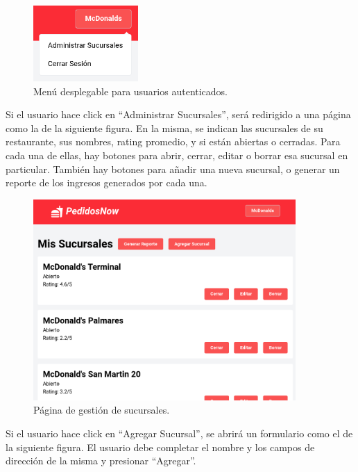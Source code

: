 \begin{figure}[H]
    \centering
    \includegraphics[width=4cm]{./img/dropdown.png}
    \caption{Menú desplegable para usuarios autenticados.}
\end{figure}

Si el usuario hace click en ``Administrar Sucursales'', será redirigido a una página como la de la siguiente figura. En la misma, se indican las sucursales de su restaurante, sus nombres, rating promedio, y si están abiertas o cerradas. Para cada una de ellas, hay botones para abrir, cerrar, editar o borrar esa sucursal en particular. También hay botones para añadir una nueva sucursal, o generar un reporte de los ingresos generados por cada una.

\begin{figure}[H]
    \centering
    \includegraphics[width=10cm]{./img/locations.png}
    \caption{Página de gestión de sucursales.}
\end{figure}

Si el usuario hace click en ``Agregar Sucursal'', se abrirá un formulario como el de la siguiente figura. El usuario debe completar el nombre y los campos de dirección de la misma y presionar ``Agregar''.

